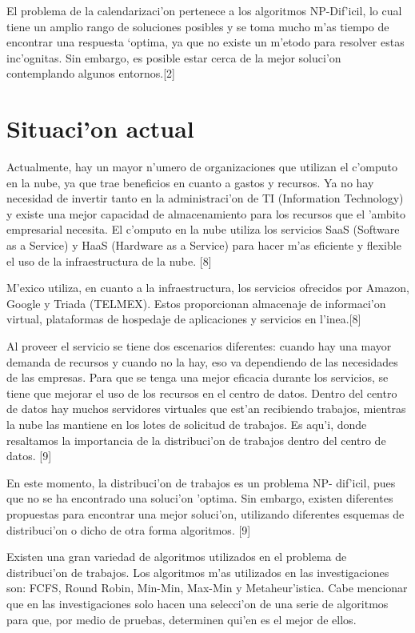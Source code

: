 El problema de la calendarizaci'on pertenece a los algoritmos NP-Dif'icil, lo cual tiene un amplio rango de soluciones posibles y se toma mucho m'as tiempo de encontrar una respuesta ‘optima, ya que no existe un m'etodo para resolver estas inc'ognitas. Sin embargo, es posible estar cerca de la mejor soluci'on contemplando algunos entornos.[2]

\section*{Situaci'on actual}

Actualmente, hay un mayor n'umero de organizaciones que utilizan el c'omputo en la nube, ya que trae beneficios en cuanto a gastos y recursos. Ya no hay necesidad de invertir tanto en la administraci'on de TI (Information Technology) y existe una mejor capacidad de almacenamiento para los recursos que el 'ambito empresarial necesita.
El c'omputo en la nube utiliza los servicios SaaS (Software as a Service) y HaaS (Hardware as a Service) para hacer m'as eficiente y flexible el uso de la infraestructura de la nube. [8]

M'exico utiliza, en cuanto a la infraestructura, los servicios ofrecidos por Amazon, Google y Triada (TELMEX). Estos proporcionan almacenaje de informaci'on virtual, plataformas de hospedaje de aplicaciones y servicios en l'inea.[8] 

Al proveer el servicio se tiene dos escenarios diferentes: cuando hay una mayor demanda de recursos y cuando no la hay,  eso va dependiendo de las necesidades de las empresas. 
Para que se tenga una mejor eficacia durante los servicios, se tiene que mejorar el uso de los recursos en el centro de datos. Dentro del centro de datos hay muchos servidores virtuales que est'an recibiendo trabajos, mientras la nube las mantiene en los lotes de solicitud de trabajos. Es aqu'i, donde resaltamos la importancia de la distribuci'on de trabajos dentro del centro de datos. [9]

En este momento, la distribuci'on de trabajos es un problema NP- dif'icil, pues que no se ha encontrado una soluci'on 'optima. Sin embargo, existen diferentes propuestas para encontrar una mejor soluci'on, utilizando diferentes esquemas de distribuci'on o dicho de otra forma algoritmos. [9]

Existen una gran variedad de algoritmos utilizados en el problema de distribuci'on de trabajos. Los algoritmos m'as utilizados en las investigaciones son: FCFS, Round Robin, Min-Min, Max-Min y Metaheur'istica. Cabe mencionar que en las investigaciones solo hacen una selecci'on de una serie de algoritmos para que, por medio de pruebas, determinen qui'en es el mejor de ellos. 

